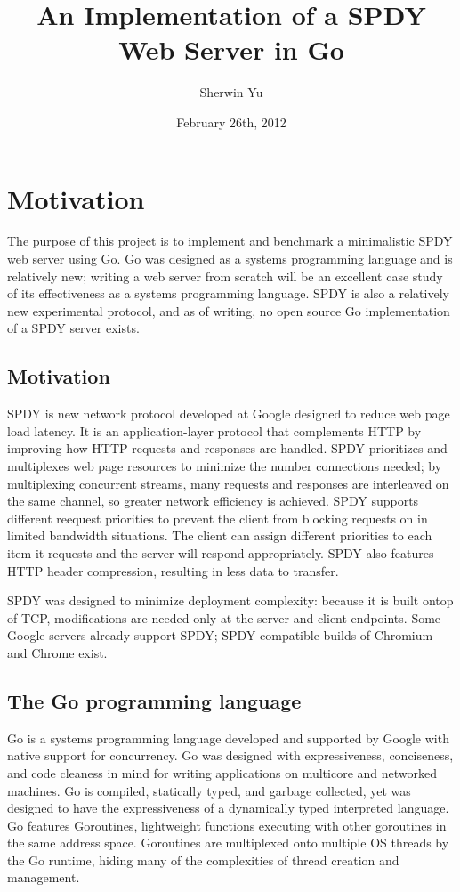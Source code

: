 \documentclass{article}
\begin{document}
\title{An Implementation of a SPDY Web Server in Go}
\author{Sherwin Yu}
\date{February 26th, 2012}
\maketitle

\section{Motivation}
\label{introduction}
The purpose of this project is to implement and benchmark a minimalistic SPDY web server using Go. Go was designed as a systems programming language and is relatively new; writing
a web server from scratch will be an excellent case study of its effectiveness as a systems programming language. SPDY is also a relatively new experimental protocol, and as of
writing, no open source Go implementation of a SPDY server exists. 

\subsection{Motivation}
\label{motivation}
SPDY is new network protocol developed at Google designed to reduce web page load latency. It is an application-layer protocol that complements HTTP by improving how HTTP
requests and responses are handled. SPDY prioritizes and multiplexes web page resources to minimize the number connections needed; by multiplexing concurrent streams, many
requests and responses are interleaved on the same channel, so greater network efficiency is achieved. SPDY supports different reequest priorities to prevent the client from
blocking requests on in limited bandwidth situations. The client can assign different priorities to each item it requests and the server will respond appropriately.  SPDY also features HTTP header compression, resulting in less data to
transfer.

SPDY was designed to minimize deployment complexity: because it is built ontop of TCP, modifications are needed only at the server and client endpoints. Some Google servers already support SPDY; SPDY compatible builds of Chromium and Chrome exist.

\subsection{The Go programming language}
Go is a systems programming language developed and supported by Google with native support for concurrency. Go was designed with expressiveness, conciseness, and code cleaness in
mind for writing applications on multicore and networked machines. Go is compiled, statically typed, and garbage collected, yet was designed to have the expressiveness of a
dynamically typed interpreted language. Go features Goroutines, lightweight functions executing with other
goroutines in the same address space. Goroutines are multiplexed onto multiple OS threads by the Go runtime, hiding many of the complexities of thread creation and management.
\end{document}
